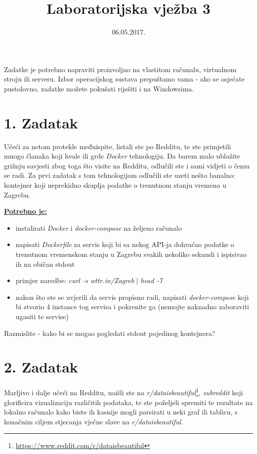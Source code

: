 \documentclass[12pt,a4paper]{article}
\begin{document}
	\title{Laboratorijska vježba 3}
	\date{\vspace{-5ex} 06.05.2017.}
	\maketitle

Zadatke je potrebno napraviti proizvoljno na vlastitom računalu, virtualnom stroju ili serveru. Izbor operacijskog sustava prepuštamo vama - ako se osjećate pustolovno, zadatke možete pokušati riješiti i na Windowsima.

\section*{1. Zadatak}

Učeći za netom protekle međuispite, listali ste po Redditu, te ste primjetili mnogo članaka koji hvale ili grde \textit{Docker} tehnologiju. Da barem malo ublažite grižnju savjesti zbog toga što visite na Redditu, odlučili ste i sami vidjeti o čemu se radi. Za prvi zadatak s tom tehnologijom odlučili ste uzeti nešto banalno: kontejner koji neprekidno skuplja podatke o trenutnom stanju vremena u Zagrebu.

\underline{\textbf{Potrebno je:}}
\begin{itemize}
  \item instalirati \textit{Docker} i \textit{docker-compose} na željeno računalo
  \item napisati \textit{Dockerfile} za servis koji bi sa nekog API-ja dohvaćao podatke o trenutnom vremenskom stanju u Zagrebu svakih nekoliko sekundi i ispisivao ih na običan stdout
  
  \item primjer naredbe: \textit{curl -s wttr.in/Zagreb} $\vert$ \textit{head -7}
  
  \item nakon što ste se uvjerili da servis propisno radi, napisati \textit{docker-compose} koji bi stvorio 4 instance tog servisa i pokrenite ga (nemojte naknadno zaboraviti ugasiti te servise)
\end{itemize}
  Razmislite - kako bi se mogao pogledati stdout pojedinog kontejnera?


\newpage


\section*{2. Zadatak}

Marljivo i dalje učeći na Redditu, naišli ste na \textit{r/dataisbeautiful}\footnote{\url{https://www.reddit.com/r/dataisbeautiful}}, \textit{subreddit} koji glorificira vizualizaciju različitih podataka, te ste poželjeli spremiti te rezultate na lokalno računalo kako biste ih kasnije mogli parsirati u neki graf ili tablicu, s konačnim ciljem stjecanja vječne slave na \textit{r/dataisbeautiful}.
\end{document}

